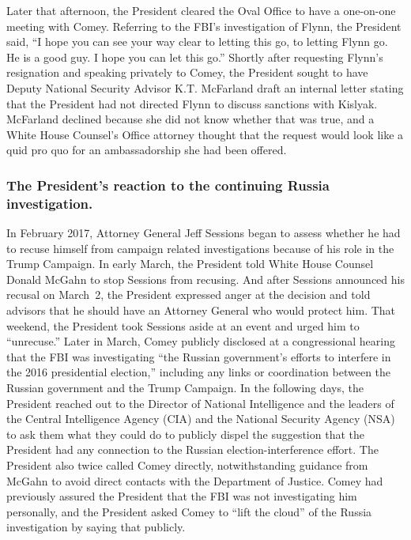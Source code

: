 Later that afternoon, the President cleared the Oval Office to have a one-on-one meeting with Comey.
Referring to the FBI's investigation of Flynn, the President said, ``I hope you can see your way clear to letting this go, to letting Flynn go.
He is a good guy.
I hope you can let this go.''
Shortly after requesting Flynn's resignation and speaking privately to Comey, the President sought to have Deputy National Security Advisor K.T. McFarland draft an internal letter stating that the President had not directed Flynn to discuss sanctions with Kislyak.
McFarland declined because she did not know whether that was true, and a White House Counsel's Office attorney thought that the request would look like a quid pro quo for an ambassadorship she had been offered.

\subsubsection*{The President's reaction to the continuing Russia investigation.}

In February 2017, Attorney General Jeff Sessions began to assess whether he had to recuse himself from campaign related investigations because of his role in the Trump Campaign.
In early March, the President told White House Counsel Donald McGahn to stop Sessions from recusing.
And after Sessions announced his recusal on March~2, the President expressed anger at the decision and told advisors that he should have an Attorney General who would protect him.
That weekend, the President took Sessions aside at an event and urged him to ``unrecuse.''
Later in March, Comey publicly disclosed at a congressional hearing that the FBI was investigating ``the Russian government's efforts to interfere in the 2016 presidential election,'' including any links or coordination between the Russian government and the Trump Campaign.
In the following days, the President reached out to the Director of National Intelligence and the leaders of the Central Intelligence Agency (CIA) and the National Security Agency (NSA) to ask them what they could do to publicly dispel the suggestion that the President had any connection to the Russian election-interference effort.
The President also twice called Comey directly, notwithstanding guidance from McGahn to avoid direct contacts with the Department of Justice.
Comey had previously assured the President that the FBI was not investigating him personally, and the President asked Comey to ``lift the cloud'' of the Russia investigation by saying that publicly.

